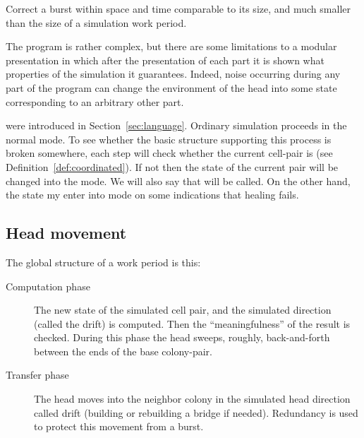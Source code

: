 \documentclass[11pt]{memoir}
\theoremstyle{definition} %
\renewcommand{\le}{\leq}
\newcommand{\fld}[1]{\ensuremath{\textit{#1\/}}}
\newcommand{\rul}[1]{\ensuremath{\texttt{#1}}}
\newcommand{\rHeal}{\rul{Heal}}
\newcommand{\Sweep}{\fld{Sweep}}
\newcommand{\Coordinated}{\mathrm{Coordinated}}
\newcommand{\Last}{\mathrm{Last}}
\newcommand{\TransferSw}{\mathrm{TransferSw}}
\newcommand{\Comp}{\rul{Compute}}
\newcommand{\Transfer}{\rul{Transfer}}
\begin{document}
\begin{goal}\label{goal:locality}
Correct a burst within space and time comparable to its size, and much smaller than the 
size of a simulation work period.
\end{goal}

The program is rather complex, but there are some limitations to a
modular presentation in which after the presentation of each part it is shown
what properties of the simulation it guarantees.
Indeed, noise occurring during any part of the  program
can change the environment of the head into  
some state corresponding to an arbitrary other part.

 were introduced in Section~\ref{sec:language}.
Ordinary simulation proceeds in the normal mode. 
To see whether the basic structure
supporting this process is broken somewhere, each step will check 
whether the current cell-pair is 
(see Definition~\ref{def:coordinated}).
If not then the state of the current pair will be changed into the  mode.
We will also say that  will be called.
On the other hand, the state my enter into  mode on some indications that
healing fails.




\subsection{Head movement}\label{sec:sweep}

The global structure of a work period is this:
\begin{description}

\item[Computation phase] 
The new state of the simulated cell pair, and the simulated direction (called the drift) is computed.
Then the ``meaningfulness'' of the result is checked.
During this phase the head sweeps, roughly, back-and-forth between
the ends of the base colony-pair.

\item[Transfer phase]
  The head moves into the neighbor colony in the simulated head direction called drift (building or rebuilding
  a bridge if needed).
  Redundancy is used to protect this movement from a burst.  
\end{description}
\end{document}
